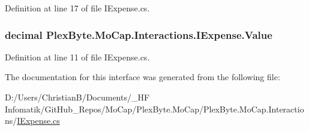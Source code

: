 Definition at line 17 of file I\+Expense.\+cs.

\subsubsection[{\texorpdfstring{Value}{Value}}]{\setlength{\rightskip}{0pt plus 5cm}decimal Plex\+Byte.\+Mo\+Cap.\+Interactions.\+I\+Expense.\+Value\hspace{0.3cm}{\ttfamily [get]}}\hypertarget{interface_plex_byte_1_1_mo_cap_1_1_interactions_1_1_i_expense_aca2002cb7567125addc9064daed1d95a}{}\label{interface_plex_byte_1_1_mo_cap_1_1_interactions_1_1_i_expense_aca2002cb7567125addc9064daed1d95a}


Definition at line 11 of file I\+Expense.\+cs.



The documentation for this interface was generated from the following file\+:\begin{DoxyCompactItemize}
\item 
D\+:/\+Users/\+Christian\+B/\+Documents/\+\_\+\+H\+F Infomatik/\+Git\+Hub\+\_\+\+Repos/\+Mo\+Cap/\+Plex\+Byte.\+Mo\+Cap/\+Plex\+Byte.\+Mo\+Cap.\+Interactions/\hyperlink{_i_expense_8cs}{I\+Expense.\+cs}\end{DoxyCompactItemize}
